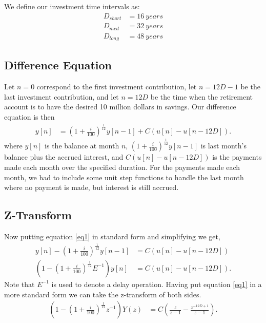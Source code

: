 \documentclass[letterpaper]{article}
\begin{document}
We define our investment time intervals as:
\begin{align*}
	D_{short} &= \SI{16}{years}  \\
	D_{med}   &= \SI{32}{years}  \\
	D_{long}  &= \SI{48}{years}
\end{align*}

\pagebreak
\subsection{Difference Equation}
Let $n=0$ correspond to the first investment contribution, let $n = 12D -1$ be the last investment contribution, and let $n = 12D$ be the time when the retirement account is to have the desired 10 million dollars in savings. Our difference equation is then
\begin{align}
	y[n] &= \left(1 + \frac{i}{100} \right)^{\frac{1}{12}} y[n-1] + C (u[n] - u[n-12D]). \label{eq1}
\end{align}
where $y[n]$ is the balance at month $n$, $\left(1 + \frac{i}{100} \right)^{\frac{1}{12}} y[n-1]$ is last month's balance plus the accrued interest, and $C(u[n] - u[n-12D])$ is the payments made each month over the specified duration. For the payments made each month, we had to include some unit step functions to handle the last month where no payment is made, but interest is still accrued.

\subsection{Z-Transform}

Now putting equation \ref{eq1} in standard form and simplifying we get,
\begin{align}
	y[n] - \left(1 + \frac{i}{100} \right)^{\frac{1}{12}} y[n-1] &= C (u[n] - u[n-12D]) \\
	\left(1 - \left(1 + \frac{i}{100} \right)^{\frac{1}{12}}E^{-1}\right)y[n] &= C (u[n] - u[n-12D]). \label{eq2}
\end{align}
Note that $E^{-1}$ is used to denote a delay operation. Having put equation \ref{eq1} in a more standard form we can take the z-transform of both sides.
\begin{align}
	\left(1 - \left(1 + \frac{i}{100} \right)^{\frac{1}{12}}z^{-1}\right)Y(z) &= C \left(\frac{z}{z-1} - \frac{z^{-12D+1}}{z-1} \right).
\end{align}
\end{document}
